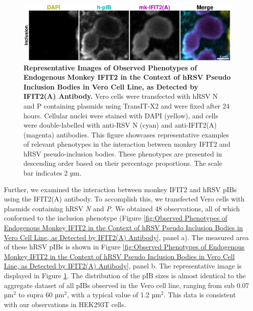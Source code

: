 \begin{figure}
    \centering
    \includegraphics[width=1\linewidth]{09. Chapter 4/Figs/01. pIB/03. IFIT2/02. IFIT2A/06. i2a-vero-hnhp.pdf}  
    \caption[Representative Images of Observed Phenotypes of Endogenous Monkey IFIT2 in the Context of hRSV Pseudo Inclusion Bodies in Vero Cell Line, as Detected by IFIT2(A) Antibody.]{\textbf{Representative Images of Observed Phenotypes of Endogenous Monkey IFIT2 in the Context of hRSV Pseudo Inclusion Bodies in Vero Cell Line, as Detected by IFIT2(A) Antibody.} Vero cells were transfected with hRSV N and P containing plasmids using TransIT-X2 and were fixed after 24 hours. Cellular nuclei were stained with DAPI (yellow), and cells were double-labelled with anti-RSV N (cyan) and anti-IFIT2(A) (magenta) antibodies. This figure showcases representative examples of relevant phenotypes in the interaction between monkey IFIT2 and hRSV pseudo-inclusion bodies. These phenotypes are presented in descending order based on their percentage proportions. The scale bar indicates 2 µm.}
    \label{fig:Representative Images of Observed Phenotypes of Endogenous Monkey IFIT2 in the Context of hRSV Pseudo Inclusion Bodies in Vero Cell Line, as Detected by IFIT2(A) Antibody}
\end{figure}

Further, we examined the interaction between monkey IFIT2 and hRSV pIBs using the IFIT2(A) antibody. To accomplish this, we transfected Vero cells with plasmids containing hRSV \textit{N} and \textit{P}. We obtained 48 observations, all of which conformed to the inclusion phenotype (Figure \ref{fig:Observed Phenotypes of Endogenous Monkey IFIT2 in the Context of hRSV Pseudo Inclusion Bodies in Vero Cell Line, as Detected by IFIT2(A) Antibody}, panel a). The measured area of these hRSV pIBs is shown in Figure \ref{fig:Observed Phenotypes of Endogenous Monkey IFIT2 in the Context of hRSV Pseudo Inclusion Bodies in Vero Cell Line, as Detected by IFIT2(A) Antibody}, panel b. The representative image is displayed in Figure \ref{fig:Representative Images of Observed Phenotypes of Endogenous Monkey IFIT2 in the Context of hRSV Pseudo Inclusion Bodies in Vero Cell Line, as Detected by IFIT2(A) Antibody}. The distribution of the pIB sizes is almost identical to the aggregate dataset of all pIBs observed in the Vero cell line, ranging from sub 0.07 \(\mbox{µm}^2\) to supra 60 \(\mbox{µm}^2\), with a typical value of 1.2 \(\mbox{µm}^2\). This data is consistent with our observations in HEK293T cells.

